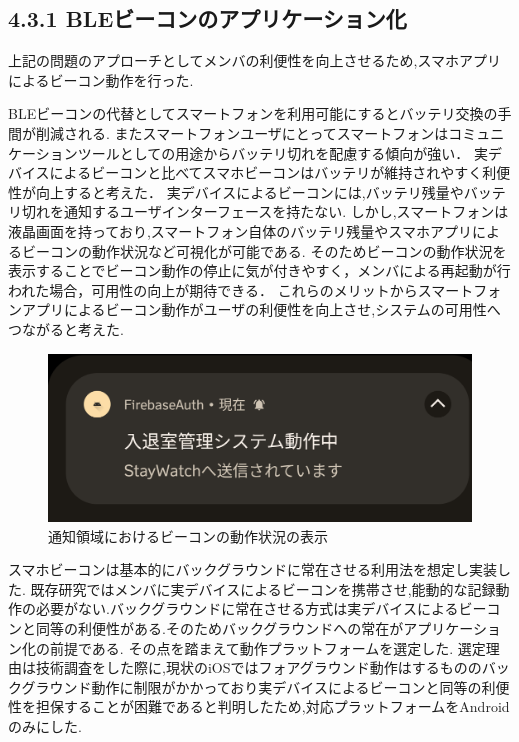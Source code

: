 \subsection*{4.3.1 BLEビーコンのアプリケーション化}
上記の問題のアプローチとしてメンバの利便性を向上させるため,スマホアプリによるビーコン動作を行った.

BLEビーコンの代替としてスマートフォンを利用可能にするとバッテリ交換の手間が削減される.
またスマートフォンユーザにとってスマートフォンはコミュニケーションツールとしての用途からバッテリ切れを配慮する傾向が強い．
実デバイスによるビーコンと比べてスマホビーコンはバッテリが維持されやすく利便性が向上すると考えた．
実デバイスによるビーコンには,バッテリ残量やバッテリ切れを通知するユーザインターフェースを持たない.
しかし,スマートフォンは液晶画面を持っており,スマートフォン自体のバッテリ残量やスマホアプリによるビーコンの動作状況など可視化が可能である.
そのためビーコンの動作状況を表示することでビーコン動作の停止に気が付きやすく，メンバによる再起動が行われた場合，可用性の向上が期待できる．
これらのメリットからスマートフォンアプリによるビーコン動作がユーザの利便性を向上させ,システムの可用性へつながると考えた.


\begin{figure}[tbh]
  \centering
  \includegraphics[width=12cm]{image/AppNofication.png}
  \caption{通知領域におけるビーコンの動作状況の表示}
  \label{multipleBPM}
\end{figure}


スマホビーコンは基本的にバックグラウンドに常在させる利用法を想定し実装した.
既存研究ではメンバに実デバイスによるビーコンを携帯させ,能動的な記録動作の必要がない.バックグラウンドに常在させる方式は実デバイスによるビーコンと同等の利便性がある.そのためバックグラウンドへの常在がアプリケーション化の前提である.
その点を踏まえて動作プラットフォームを選定した.
選定理由は技術調査をした際に,現状のiOSではフォアグラウンド動作はするもののバックグラウンド動作に制限がかかっており実デバイスによるビーコンと同等の利便性を担保することが困難であると判明したため,対応プラットフォームをAndroidのみにした.

